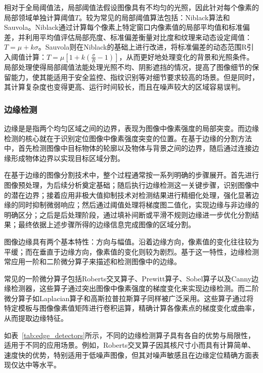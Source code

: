 相对于全局阈值法，局部阈值法假设图像具有不均匀的光照，因此针对每个像素的局部领域单独计算阈值$T$。较为常见的局部阈值算法包括：Niblack算法和Sauvola。Niblack通过计算每个像素上特定窗口内像素值的局部平均值和标准偏差，并利用平均值评估局部亮度、标准偏差衡量对比度和纹理来动态设定阈值：$ T=\mu+k \sigma $。Sauvola则在Niblack的基础上进行改进，将标准偏差的动态范围R引入阈值计算：$ T=\mu\left[1+k\left(\frac{\sigma}{R}-1\right)\right] $，从而更好地处理变化的背景和光照条件。局部处理使得局部阈值法能处理光照不均、阴影遮挡的情况，提高了图像细节的保留能力，使其能适用于安全监控、指纹识别等对细节要求较高的场景。但是同时，其计算复杂度也变得更高、运行时间较长，而且在噪声较大的区域容易误判。

\subsubsection{边缘检测}


边缘是是指两个均匀区域之间的边界，表现为图像中像素强度的局部突变。而边缘检测的核心就在于识别定位图像中像素强度突变的位置。在基于边缘的分割方法中，首先检测图像中目标物体的轮廓以及物体与背景之间的边界，随后通过连接边缘形成物体边界以实现目标区域分割。

在基于边缘的图像分割技术中，整个过程通常按一系列明确的步骤展开。首先进行图像预处理，为后续分析奠定基础；随后执行边缘检测这一关键步骤，识别图像中的潜在边界；接着应用非极大值抑制技术对检测结果进行精细化处理，强化显著边缘的同时抑制微弱响应；然后通过阈值处理将梯度图二值化，实现边缘与非边缘的明确区分；之后是后处理阶段，通过填补间断或平滑不规则边缘进一步优化分割结果；最终依据上述步骤所得的边缘信息完成图像的区域分割。

图像边缘具有两个基本特性：方向与幅值。沿着边缘方向，像素值的变化往往较为平缓；而在垂直于边缘方向，像素值的变化则较为剧烈。基于这一特性，边缘检测常应用一阶和二阶微分算子来描述和检测图像中的边缘。

常见的一阶微分算子包括Roberts交叉算子、Prewitt算子、Sobel算子以及Canny边缘检测器，这些算子通过突出图像中像素强度的梯度变化来实现边缘检测。而二阶微分算子如Laplacian算子和高斯拉普拉斯算子同样被广泛采用。这些算子通过将特定模板与图像像素值矩阵进行卷积运算，精确计算各像素点的梯度变化或曲率，从而提取边缘特征。

如表~\ref{tab:edge_detectors}所示，不同的边缘检测算子具有各自的优势与局限性，适用于不同的应用场景。例如，Roberts交叉算子因其核尺寸小而具有计算简单、速度快的优势，特别适用于低噪声图像，但其对噪声敏感且在边缘定位精确方面表现仅达中等水平。

